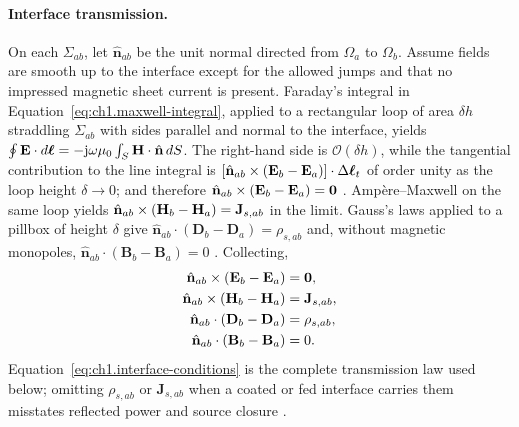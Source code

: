 \paragraph{Interface transmission.}
On each $\Sigma_{ab}$, let $\hat{\mathbf{n}}_{ab}$ be the unit normal directed from $\Omega_a$ to $\Omega_b$. Assume fields are smooth up to the interface except for the allowed jumps and that no impressed magnetic sheet current is present. Faraday's integral in Equation~\eqref{eq:ch1.maxwell-integral}, applied to a rectangular loop of area $\delta h$ straddling $\Sigma_{ab}$ with sides parallel and normal to the interface, yields $\oint \mathbf{E}\cdot d\boldsymbol{\ell}=-\mathrm{j}\omega\mu_0\int_S \mathbf{H}\cdot\hat{\mathbf{n}}\,dS$. The right-hand side is $\mathcal{O}(\delta h)$, while the tangential contribution to the line integral is $[\hat{\mathbf{n}}_{ab}\times(\mathbf{E}_b-\mathbf{E}_a)]\cdot\Delta\boldsymbol{\ell}_t$ of order unity as the loop height $\delta\to 0$; and therefore $\hat{\mathbf{n}}_{ab}\times(\mathbf{E}_b-\mathbf{E}_a)=\mathbf{0}$ \cite{maxwell1873,jackson1999}. Amp\`ere--Maxwell on the same loop yields $\hat{\mathbf{n}}_{ab}\times(\mathbf{H}_b-\mathbf{H}_a)=\mathbf{J}_{s,ab}$ in the limit. Gauss's laws applied to a pillbox of height $\delta$ give $\hat{\mathbf{n}}_{ab}\cdot(\mathbf{D}_b-\mathbf{D}_a)=\rho_{s,ab}$ and, without magnetic monopoles, $\hat{\mathbf{n}}_{ab}\cdot(\mathbf{B}_b-\mathbf{B}_a)=0$ \cite{stratton1941}. Collecting,
\begin{equation}
\label{eq:ch1.interface-conditions}
\begin{aligned}
\hat{\mathbf{n}}_{ab}\times(\mathbf{E}_b-\mathbf{E}_a)&=\mathbf{0},\\
\hat{\mathbf{n}}_{ab}\times(\mathbf{H}_b-\mathbf{H}_a)&=\mathbf{J}_{s,ab},\\
\hat{\mathbf{n}}_{ab}\cdot(\mathbf{D}_b-\mathbf{D}_a)&=\rho_{s,ab},\\
\hat{\mathbf{n}}_{ab}\cdot(\mathbf{B}_b-\mathbf{B}_a)&=0.
\end{aligned}
\end{equation}
Equation~\eqref{eq:ch1.interface-conditions} is the complete transmission law used below; omitting $\rho_{s,ab}$ or $\mathbf{J}_{s,ab}$ when a coated or fed interface carries them misstates reflected power and source closure \cite{collin2001,jackson1999}.

